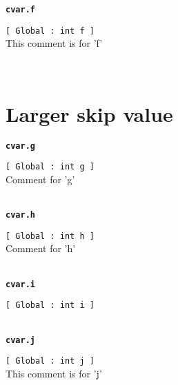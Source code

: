 {\tt \bf cvar.f }
\\
\makebox[0.5in]{}\begin{minipage}[t]{6in}
{\tt [ Global : int  f ]  }\\
   This comment is for 'f'   
\\

\end{minipage}\\

\section{Larger skip value}{\tt \bf cvar.g }
\\
\makebox[0.5in]{}\begin{minipage}[t]{6in}
{\tt [ Global : int  g ]  }\\
   Comment for 'g'   
\\

\end{minipage}\\

{\tt \bf cvar.h }
\\
\makebox[0.5in]{}\begin{minipage}[t]{6in}
{\tt [ Global : int  h ]  }\\
   Comment for 'h'   
\\

\end{minipage}\\

{\tt \bf cvar.i }
\\
\makebox[0.5in]{}\begin{minipage}[t]{6in}
{\tt [ Global : int  i ]  }\\

\end{minipage}\\

{\tt \bf cvar.j }
\\
\makebox[0.5in]{}\begin{minipage}[t]{6in}
{\tt [ Global : int  j ]  }\\
   This comment is for 'j'   
\\

\end{minipage}\\



